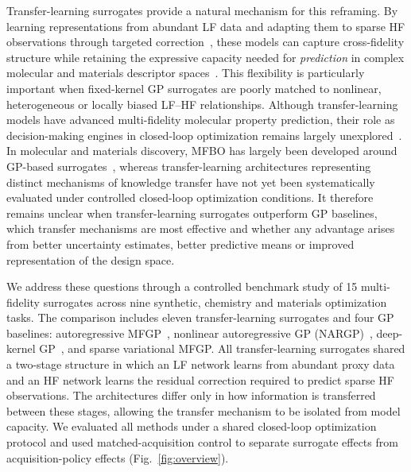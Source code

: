 \documentclass[11pt,a4paper]{article}%
\begin{document}
Transfer-learning surrogates provide a natural mechanism for this reframing. By learning representations
from abundant LF data and adapting them to sparse HF observations through targeted correction~\citep{yosinski2014transferable}, these models can capture cross-fidelity structure while retaining the expressive capacity needed for \emph{prediction} in complex molecular and materials descriptor spaces~\citep{buterez2024transfer}. This flexibility is particularly important when fixed-kernel GP surrogates are poorly matched to nonlinear, heterogeneous or locally biased LF--HF relationships. Although transfer-learning models have advanced multi-fidelity molecular property prediction, their role as decision-making engines in closed-loop optimization remains largely unexplored~\citep{li2020dnnmfbo}. In molecular and materials discovery, MFBO has largely been developed around GP-based
surrogates~\citep{sabanza2025best}, whereas transfer-learning architectures representing distinct 
mechanisms of knowledge transfer have not yet been systematically evaluated under controlled closed-loop optimization conditions. It therefore remains unclear when transfer-learning surrogates outperform GP baselines, which transfer mechanisms are most effective and whether any advantage arises from better uncertainty estimates, better predictive means or improved representation of the design space.

We address these questions through a controlled benchmark study of 15 multi-fidelity surrogates across nine synthetic, chemistry and materials optimization tasks. The comparison includes eleven transfer-learning
surrogates and four GP baselines: autoregressive
MFGP~\citep{kennedy2000predicting}, nonlinear autoregressive GP (NARGP)~\citep{perdikaris2017nonlinear},
deep-kernel GP~\citep{wilson2016deep}, and sparse variational MFGP\citep{titsias2009variational, hensman2013gaussian}. All transfer-learning surrogates shared a two-stage structure in which  an LF network learns from abundant proxy data and an HF network learns the residual correction required to predict sparse HF observations\citep{gawlikowski2023survey}.
The architectures differ only in how information is transferred between these stages, allowing the transfer mechanism to be isolated from model capacity. We evaluated all methods under a shared closed-loop optimization protocol and used matched-acquisition control to separate surrogate effects from acquisition-policy effects (Fig.~\ref{fig:overview}).
\end{document}
